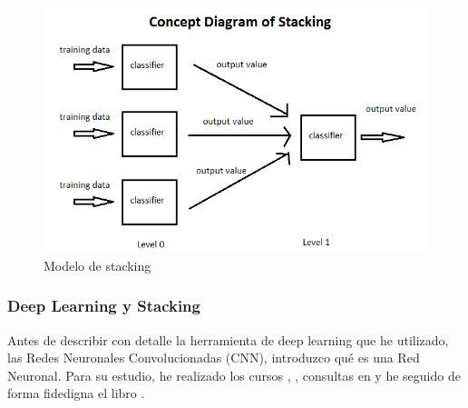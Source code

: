 \begin{figure}[H] %
	\centering
	\includegraphics[scale=0.5]{stacking.png}  %
	\caption{Modelo de stacking} 
	\label{fig:stack}
\end{figure}

\subsubsection{Deep Learning y Stacking}

Antes de describir con detalle la herramienta de deep learning que he utilizado, las Redes Neuronales Convolucionadas (CNN), introduzco qué es una Red Neuronal. Para su estudio, he realizado los cursos \cite{curso-cnn}, \cite{curso-nn}, consultas en  \cite{miriam} y he seguido de forma fidedigna el libro \cite{berzal}.

